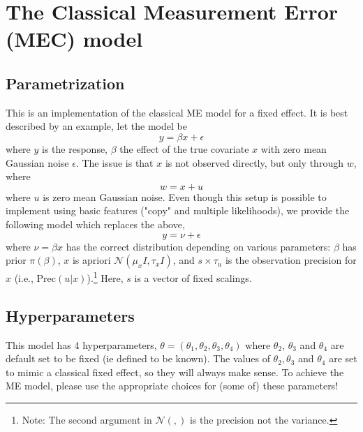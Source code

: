 \documentclass[a4paper,11pt]{article}
\begin{document}
\section*{The Classical Measurement Error (MEC) model}

\subsection*{Parametrization}

This is an implementation of the classical ME model for a fixed
effect. It is best described by an example, let  the model be
\begin{displaymath}
    y = \beta x + \epsilon{}
\end{displaymath}
where $y$ is the response, $\beta$ the effect of the true covariate
$x$ with zero mean Gaussian noise $\epsilon$. The issue is that $x$ is
not observed directly, but only through $w$, where
\begin{displaymath}
    w = x + u
\end{displaymath}
where $u$ is zero mean Gaussian noise. Even though this setup is
possible to implement using basic features ("copy" and multiple
likelihoods), we provide the following model which replaces the above,
\begin{displaymath}
    y = \nu + \epsilon{}
\end{displaymath}
where $\nu=\beta x$ has the correct distribution depending on various parameters:
$\beta$ has prior $\pi(\beta)$, $x$ is apriori ${\mathcal N}(\mu_{x}
{I}, \tau_{x} {I})$, and $s\times\tau_u$ is the observation
precision for $x$ (i.e., $\text{Prec}(u|x)$).\footnote{Note:
    The second argument in ${\mathcal N}(,)$ is the precision not the
    variance.} Here, $s$ is a vector of fixed scalings.



\subsection*{Hyperparameters}

This model has 4 hyperparameters, $\theta = (\theta_{1}, \theta_{2},
\theta_{3}, \theta_{4})$ where $\theta_{2}$, $\theta_{3}$ and
$\theta_{4}$ are default set to be fixed (ie defined to be known). The
values of $\theta_{2}, \theta_{3}$ and $\theta_{4}$ are set to mimic a
classical fixed effect, so they will always make sense. To achieve the
ME model, please use the appropriate choices for
(some of) these parameters!
\end{document}
